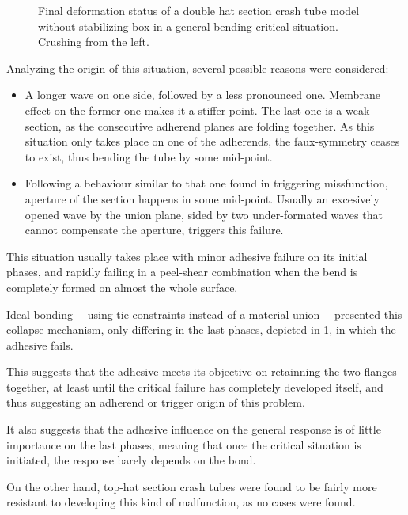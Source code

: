 \documentclass[
documentsize = a4, %
font = cmr, %
typesize = 11, %
printmode = true,
onehalfspacing = true,
language = en, %
titlepage = udciccp, %
degree = pt, %
dedication = true,
acknowledgements = true,
abstract-en = true,
abstract-es = false,
abstract-ga = false,
epigraphs = true,
toc = true,
lof = true,
lot = true,
frontmatterintoc = false,
notation = false,
minimal = false,
]{UDCthesis}
\begin{document}
\begin{figure}
\begin{minipage}[b]{.3\linewidth}
	\end{minipage}
\caption[Final deformation status of a double hat section crash tube model without stabilizing box in a general bending critical situation.]{Final deformation status of a double hat section crash tube model without stabilizing box in a general bending critical situation. Crushing from the left.}
\label{fig:general_bending}
\end{figure}

Analyzing the origin of this situation, several possible reasons were considered:
\begin{itemize}
	\item A longer wave on one side, followed by a less pronounced one. Membrane effect on the former one makes it a stiffer point. The last one is a weak section, as the consecutive adherend planes are folding together. As this situation only takes place on one of the adherends, the faux-symmetry ceases to exist, thus bending the tube by some mid-point.

	\item Following a behaviour similar to that one found in triggering missfunction, aperture of the section happens in some mid-point. Usually an excesively opened wave by the union plane, sided by two under-formated waves that cannot compensate the aperture, triggers this failure.
\end{itemize}

This situation usually takes place with minor adhesive failure on its initial phases, and rapidly failing in a peel-shear combination when the bend is completely formed on almost the whole surface.

Ideal bonding ---using tie constraints instead of a material union--- presented this collapse mechanism, only differing in the last phases, depicted in \cref{fig:general_bending}, in which the adhesive fails.

This suggests that the adhesive meets its objective on retainning the two flanges together, at least until the critical failure has completely developed itself, and thus suggesting an adherend or trigger origin of this problem.

It also suggests that the adhesive influence on the general response is of little importance on the last phases, meaning that once the critical situation is initiated, the response barely depends on the bond.

On the other hand, top-hat section crash tubes were found to be fairly more resistant to developing this kind of malfunction, as no cases were found.
\end{document}

